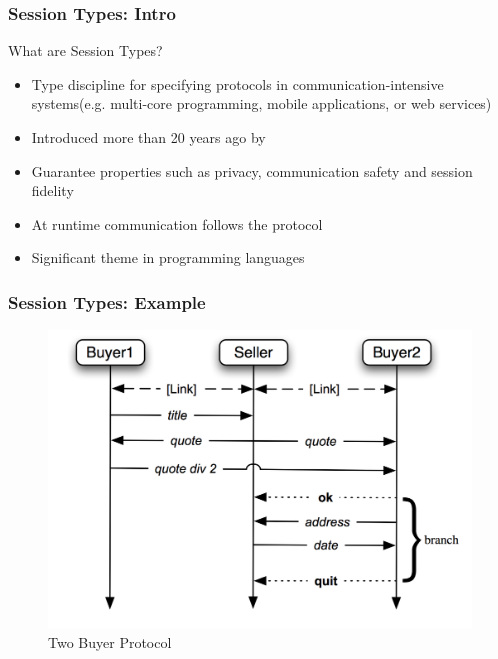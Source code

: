 \begin{frame}\frametitle{Session Types: Intro}
What are Session Types?
\begin{itemize}
\item Type discipline for specifying protocols in communication-intensive systems(e.g. multi-core programming, mobile applications, or web services)
\item Introduced more than 20 years ago by~\cite{honda93, takeuchi94, honda98}
\item Guarantee properties such as privacy, communication safety and session fidelity
\item At runtime communication follows the protocol
\item Significant theme in programming languages
\end{itemize}

\end{frame}

\begin{frame}\frametitle{Session Types: Example}

  \begin{figure}[htb]
    \centering
    \includegraphics[scale=0.45]{examples/TwoBuyer.png}
    \caption{Two Buyer Protocol~\cite{honda2008multiparty}}
  \end{figure}
\end{frame}

